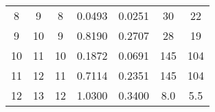 \begin{table}
\begin{adjustbox}{width=0.95\textwidth,center=\textwidth}
\begin{tabular}{ccccccc}
8                                                         & 9                                                           & 8                                                   & 0.0493                                                                    & 0.0251                                                                    & 30                                                                          & 22                                                                               \\
9                                                         & 10                                                          & 9                                                   & 0.8190                                                                    & 0.2707                                                                    & 28                                                                          & 19                                                                               \\
10                                                        & 11                                                          & 10                                                  & 0.1872                                                                    & 0.0691                                                                    & 145                                                                         & 104                                                                              \\
11                                                        & 12                                                          & 11                                                  & 0.7114                                                                    & 0.2351                                                                    & 145                                                                         & 104                                                                              \\
12                                                        & 13                                                          & 12                                                  & 1.0300                                                                    & 0.3400                                                                    & 8.0                                                                         & 5.5                                                                              \\

\end{tabular}
\end{adjustbox}
\end{table}
